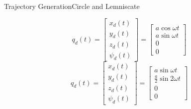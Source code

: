 
\begin{frame}{Trajectory Generation}{Circle and Lemniscate}
	
	\begin{equation} \label{eq:circle_constant}
	q_d(t) = 
	\begin{bmatrix}
	x_d(t)\\
	y_d(t)\\
	z_d(t)\\
	\psi_d(t)
	\end{bmatrix} = \begin{bmatrix}
	a\cos{\omega t}\\
	a\sin{\omega t}\\
	0\\
	0
	\end{bmatrix}
	\end{equation}
	\begin{equation} \label{eq:lemniscate}
	q_d(t) = 
	\begin{bmatrix}
	x_d(t)\\
	y_d(t)\\
	z_d(t)\\
	\psi_d(t)
	\end{bmatrix} = \begin{bmatrix}
	a\sin{\omega t}\\
	\frac{a}{2}\sin{2\omega t}\\
	0\\
	0
	\end{bmatrix}
	\end{equation}
	\end{frame}

